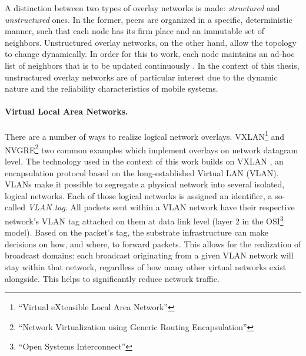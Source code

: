 A distinction between two types of overlay networks is made: \emph{structured} and \emph{unstructured} ones. In the former, peers are organized in a specific, deterministic manner, such that each node has its firm place and an immutable set of neighbors. Unstructured overlay networks, on the other hand, allow the topology to change dynamically. In order for this to work, each node maintains an ad-hoc list of neighbors that is to be updated continuously \cite{tanenbaum2017distributed}. In the context of this thesis, unstructured overlay networks are of particular interest due to the dynamic nature and the reliability characteristics of mobile systems.

\paragraph{Virtual Local Area Networks.}
There are a number of ways to realize logical network overlays. VXLAN\footnote{``Virtual eXtensible Local Area Network''} and NVGRE\footnote{``Network Virtualization using Generic Routing Encapsulation''} two common examples which implement overlays on network datagram level. The technology used in the context of this work builds on VXLAN \cite{rfc7348}, an encapsulation protocol based on the long-established Virtual LAN (VLAN). VLANs make it possible to segregate a physical network into several isolated, logical networks. Each of those logical networks is assigned an identifier, a so-called \emph{VLAN tag}. All packets sent within a VLAN network have their respective network's VLAN tag attached on them at data link level (layer 2 in the OSI\footnote{``Open Systems Interconnect''} model). Based on the packet's tag, the substrate infrastructure can make decisions on how, and where, to forward packets. This allows for the realization of broadcast domains: each broadcast originating from a given VLAN network will stay within that network, regardless of how many other virtual networks exist alongside. This helps to significantly reduce network traffic.

